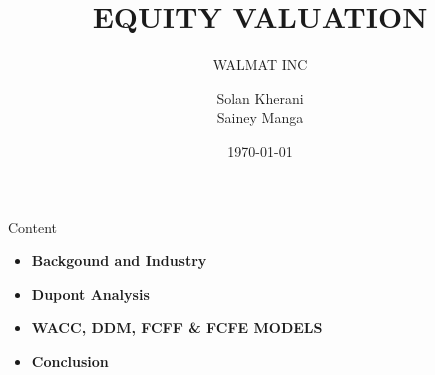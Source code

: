 \documentclass[pdf]{beamer}
\title[WALMART INC]{EQUITY VALUATION }
\subtitle{WALMAT INC}
\theoremstyle{remark}
\theoremstyle{definition}
\begin{document}
\author[Solan, Sainey]{
	\begin{tabular}{c} 
	\Large
	Solan Kherani\\
	\large
    Sainey Manga\\
\end{tabular}
\vspace{-2ex}}


\date{\today}

\begin{noheadline}
\begin{frame}\maketitle\end{frame}
\end{noheadline}



\begin{frame}[allowframebreaks]{Content}
   \begin{itemize}
       \item \textbf{Backgound and Industry}
       \item \textbf{Dupont Analysis}
       \item \textbf{WACC, DDM, FCFF \& FCFE MODELS}
       \item \textbf{Conclusion}
  
    \end{itemize}
	
\end{frame}
\end{document}
